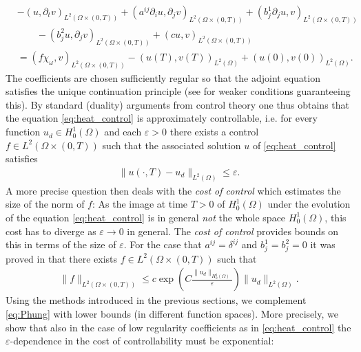 \documentclass[12pt,twoside]{amsart}
\numberwithin{equation}{section}
\renewcommand{\leq}{\leqslant}
\newcommand {\p} {\partial}
\newcommand{\eps}{\varepsilon}
\begin{document}
\begin{align*}
&-(u,\p_t v)_{L^2(\Omega \times (0,T))}
+ (a^{ij}\p_i u, \p_j v)_{L^2(\Omega \times (0,T))} + (b_j^1 \p_j u, v)_{L^2(\Omega \times (0,T))} \\
& \qquad - (b_j^2 u, \p_j v)_{L^2(\Omega \times (0,T))} + (cu, v)_{L^2(\Omega \times (0,T))}\\
&  = (f \chi_{\omega},v)_{L^2(\Omega \times (0,T))} - (u(T),v(T))_{L^2(\Omega)}+(u(0),v(0))_{L^2(\Omega)}.
\end{align*}
The coefficients are chosen sufficiently regular so that the adjoint equation satisfies the unique continuation principle (see \cite{KochTataru} for weaker conditions guaranteeing this). By standard (duality) arguments from control theory one thus obtains that the equation \eqref{eq:heat_control} is approximately controllable, i.e. for every function $u_d \in H^1_0(\Omega)$ and each $\eps>0$ there exists a control $f \in L^2(\Omega \times (0,T))$ such that the associated solution $u$ of \eqref{eq:heat_control} satisfies
\begin{align*}
\|u(\cdot, T)- u_d\|_{L^2(\Omega)} \leq \eps.
\end{align*}
A more precise question then deals with the \emph{cost of control} which estimates the size of the norm of $f$: As the image at time $T>0$ of $H^1_0(\Omega)$ under the evolution of the equation \eqref{eq:heat_control} is in general \emph{not} the whole space $H^1_0(\Omega)$, this cost has to diverge as $\eps \rightarrow 0$ in general. The \emph{cost of control} provides bounds on this in terms of the size of $\eps$. For the case that $a^{ij}=\delta^{ij}$ and $b_j^1 = b_j^2 =0$ it was proved in \cite{FernandezCaraZuazua, Phung} that there exists $f \in L^2(\Omega \times (0,T))$ such that
\begin{align}
\label{eq:Phung}
\|f\|_{L^2(\Omega \times (0,T))} \leq c\exp\left( C \frac{\|u_d\|_{H^1_0(\Omega)}}{\eps}\right) \|u_d\|_{L^2(\Omega)}.
\end{align} 
Using the methods introduced in the previous sections, we complement \eqref{eq:Phung} with lower bounds (in different function spaces). More precisely, we show that also in the case of low regularity coefficients as in \eqref{eq:heat_control} the $\eps$-dependence in the cost of controllability must be exponential:
\end{document}
